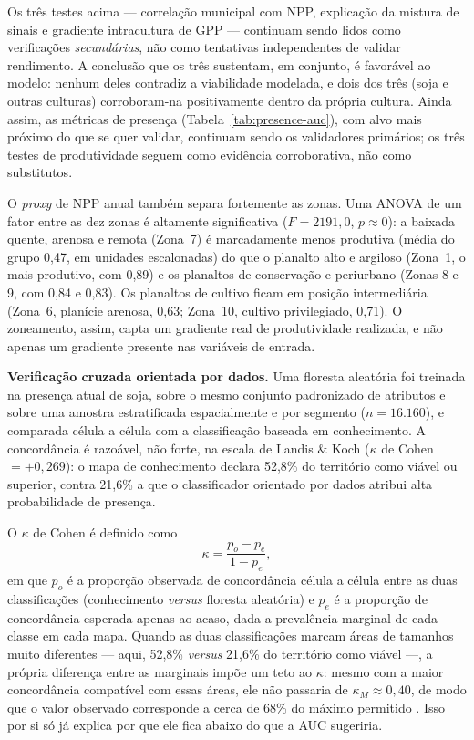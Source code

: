 Os três testes acima --- correlação municipal com NPP, explicação da mistura de sinais e
gradiente intracultura de GPP --- continuam sendo lidos como verificações \emph{secundárias},
não como tentativas independentes de validar rendimento. A conclusão que os três sustentam, em conjunto,
é favorável ao modelo: nenhum deles contradiz a viabilidade modelada, e
dois dos três (soja e outras culturas) corroboram-na positivamente dentro da própria cultura.
Ainda assim, as métricas de presença (Tabela~\ref{tab:presence-auc}), com alvo mais próximo do
que se quer validar, continuam sendo os validadores primários; os três testes de produtividade
seguem como evidência corroborativa, não como substitutos.

O \emph{proxy} de NPP anual também separa fortemente as zonas. Uma ANOVA de um fator entre as
dez zonas é altamente significativa ($F = 2191{,}0$, $p \approx 0$): a baixada quente, arenosa
e remota (Zona~7) é marcadamente menos produtiva (média do grupo 0,47, em unidades
escalonadas) do que o planalto alto e argiloso (Zona~1, o mais produtivo, com 0,89) e os
planaltos de conservação e periurbano (Zonas 8 e 9, com 0,84 e 0,83). Os planaltos de cultivo
ficam em posição intermediária (Zona~6, planície arenosa, 0,63; Zona~10, cultivo privilegiado,
0,71). O zoneamento, assim, capta um gradiente real de produtividade realizada, e não apenas
um gradiente presente nas variáveis de entrada.



\textbf{Verificação cruzada orientada por dados.} Uma floresta aleatória foi treinada na
presença atual de soja, sobre o mesmo conjunto padronizado de atributos e sobre uma amostra
estratificada espacialmente e por segmento ($n = 16.160$), e comparada célula a célula com a
classificação baseada em conhecimento. A concordância é razoável, não forte, na escala de
Landis \& Koch ($\kappa$ de Cohen $= +0{,}269$): o mapa de conhecimento declara 52,8\% do
território como viável ou superior, contra 21,6\% a que o classificador orientado por dados
atribui alta probabilidade de presença.

O $\kappa$ de Cohen é definido como
\begin{equation*}
  \kappa = \frac{p_o - p_e}{1 - p_e},
\end{equation*}
em que $p_o$ é a proporção observada de concordância célula a célula entre as duas
classificações (conhecimento \emph{versus} floresta aleatória) e $p_e$ é a proporção de
concordância esperada apenas ao acaso, dada a prevalência marginal de cada classe em cada mapa.
Quando as duas classificações marcam áreas de tamanhos muito diferentes --- aqui, 52,8\% \emph{
versus} 21,6\% do território como viável ---, a própria diferença entre as marginais impõe um teto
ao $\kappa$: mesmo com a maior concordância compatível com essas áreas, ele não passaria de
$\kappa_M \approx 0{,}40$, de modo que o valor observado corresponde a cerca de 68\% do máximo
permitido \citep[pp.~42--43]{cohen_coefficient_1960}. Isso por si só já explica por que ele fica
abaixo do que a AUC sugeriria.

